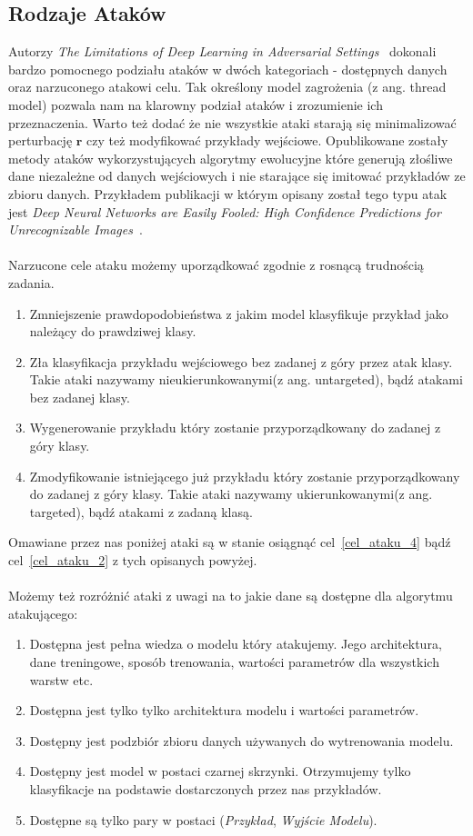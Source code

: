 \documentclass[
    left=2.5cm,         %
    right=2.5cm,        %
    top=2.5cm,          %
    bottom=3cm,         %
    bindingoffset=6mm,  %
    nohyphenation=false %
]{eiti/eiti-thesis}
\renewcommand{\vec}[1]{\mathbf{#1}}
\begin{document}
\subsection{Rodzaje Ataków}\label{attack-kinds}
Autorzy \textit{The Limitations of Deep Learning in Adversarial Settings}~\cite{DBLP:journals/corr/PapernotMJFCS15}
dokonali bardzo pomocnego podziału ataków w dwóch kategoriach - dostępnych danych oraz narzuconego atakowi celu. Tak określony
model zagrożenia (z ang. thread model) pozwala nam na klarowny podział ataków i zrozumienie ich przeznaczenia. Warto też dodać
że nie wszystkie ataki starają się minimalizować perturbację $\vec{r}$ czy też modyfikować przykłady wejściowe. Opublikowane zostały
metody ataków wykorzystujących algorytmy ewolucyjne które generują złośliwe dane niezależne od danych wejściowych i nie starające się
imitować przykładów ze zbioru danych. Przykładem publikacji w którym opisany został tego typu atak jest \textit{Deep Neural Networks are Easily Fooled: High Confidence Predictions for Unrecognizable Images}~\cite{DBLP:journals/corr/NguyenYC14}.
\\~\\
Narzucone cele ataku możemy uporządkować zgodnie z rosnącą trudnością zadania.
\begin{enumerate}
    \item Zmniejszenie prawdopodobieństwa z jakim model klasyfikuje przykład jako należący do prawdziwej klasy.
    \item \label{cel_ataku_2} Zła klasyfikacja przykładu wejściowego bez zadanej z góry przez atak klasy. Takie ataki nazywamy nieukierunkowanymi(z ang. untargeted), bądź atakami bez zadanej klasy.
    \item Wygenerowanie przykładu który zostanie przyporządkowany do zadanej z góry klasy.
    \item \label{cel_ataku_4} Zmodyfikowanie istniejącego już przykładu który zostanie przyporządkowany do zadanej z góry klasy. Takie ataki nazywamy ukierunkowanymi(z ang. targeted), bądź atakami z zadaną klasą.
\end{enumerate}
Omawiane przez nas poniżej ataki są w stanie osiągnąć cel~\ref{cel_ataku_4} bądź cel~\ref{cel_ataku_2} z tych opisanych powyżej.
\\~\\
Możemy też rozróżnić ataki z uwagi na to jakie dane są dostępne dla algorytmu atakującego:
\begin{enumerate}
    \item \label{atak_1} Dostępna jest pełna wiedza o modelu który atakujemy. Jego architektura, dane treningowe, sposób trenowania, wartości parametrów dla wszystkich warstw etc.
    \item \label{atak_2} Dostępna jest tylko tylko architektura modelu i wartości parametrów.
    \item Dostępny jest podzbiór zbioru danych używanych do wytrenowania modelu.
    \item Dostępny jest model w postaci czarnej skrzynki. Otrzymujemy tylko klasyfikacje na podstawie dostarczonych przez nas przykładów.
    \item Dostępne są tylko pary w postaci (\textit{Przykład}, \textit{Wyjście Modelu}).
\end{enumerate}
\end{document}
